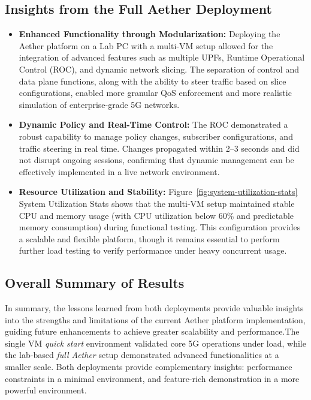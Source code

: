 \subsection{Insights from the Full Aether Deployment}
\begin{itemize}
    \item \textbf{Enhanced Functionality through Modularization:}  
    Deploying the Aether platform on a Lab PC with a multi-VM setup allowed for the integration of advanced features such as multiple UPFs, Runtime Operational Control (ROC), and dynamic network slicing. The separation of control and data plane functions, along with the ability to steer traffic based on slice configurations, enabled more granular QoS enforcement and more realistic simulation of enterprise-grade 5G networks.
    
    \item \textbf{Dynamic Policy and Real-Time Control:}  
    The ROC demonstrated a robust capability to manage policy changes, subscriber configurations, and traffic steering in real time. Changes propagated within 2--3 seconds and did not disrupt ongoing sessions, confirming that dynamic management can be effectively implemented in a live network environment.
    
    \item \textbf{Resource Utilization and Stability:}  
    {Figure~\ref{fig:system-utilization-stats} System Utilization Stats} shows that the multi-VM setup maintained stable CPU and memory usage (with CPU utilization below 60\% and predictable memory consumption) during functional testing. This configuration provides a scalable and flexible platform, though it remains essential to perform further load testing to verify performance under heavy concurrent usage.
\end{itemize}


\subsection{Overall Summary of Results}
In summary, the lessons learned from both deployments provide valuable insights into the strengths and limitations of the current Aether platform implementation, guiding future enhancements to achieve greater scalability and performance.The single VM \emph{quick start} environment validated core 5G operations under load, while the lab-based \emph{full Aether} setup demonstrated advanced functionalities at a smaller scale. 
Both deployments provide complementary insights: performance constraints in a minimal environment, and feature-rich demonstration in a more powerful environment.

